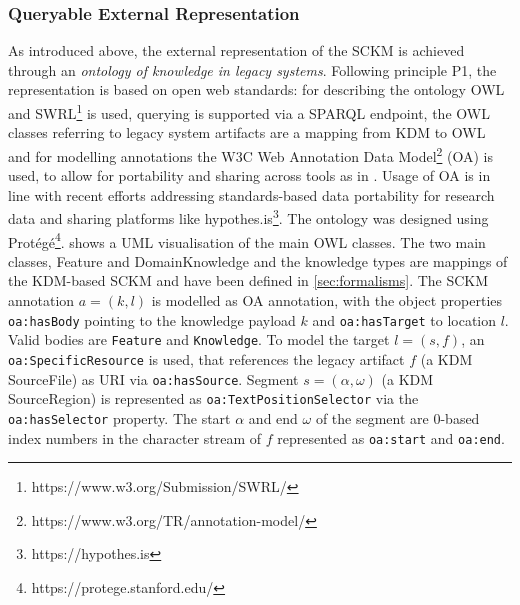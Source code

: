 \hypertarget{sec:re.impl.representation}{%
\subsubsection{Queryable External Representation}\label{sec:re.impl.representation}}

As introduced above, the external representation of the SCKM is achieved through an \emph{ontology of knowledge in legacy systems}.
Following principle P1, the representation is based on open web standards: for describing the ontology OWL and SWRL\footnote{https://www.w3.org/Submission/SWRL/} is used, querying is supported via a SPARQL endpoint, the OWL classes referring to legacy system artifacts are a mapping from KDM to OWL and for modelling annotations the W3C Web Annotation Data Model\footnote{https://www.w3.org/TR/annotation-model/} (OA) is used, to allow for portability and sharing across tools as in \autocite{Diaz2019OpenAnnotationInSLRs}.
Usage of OA is in line with recent efforts addressing standards-based data portability for research data \autocite{Diaz2019OpenAnnotationInSLRs} and sharing platforms like hypothes.is\footnote{https://hypothes.is}.
The ontology was designed using Protégé\footnote{https://protege.stanford.edu/}.
 shows a UML visualisation of the main OWL classes.
The two main classes, Feature and DomainKnowledge and the knowledge types are mappings of the KDM-based SCKM and have been defined in \cref{sec:formalisms}.
The SCKM annotation \(a=(k, l)\) is modelled as OA annotation, with the object properties \texttt{oa:hasBody} pointing to the knowledge payload \(k\) and \texttt{oa:hasTarget} to location \(l\).
Valid bodies are \texttt{Feature} and \texttt{Knowledge}.
To model the target \(l = (s,f)\), an \texttt{oa:SpecificResource} is used, that references the legacy artifact \(f\) (a KDM SourceFile) as URI via \texttt{oa:hasSource}.
Segment \(s=(\alpha, \omega)\) (a KDM SourceRegion) is represented as \texttt{oa:TextPositionSelector} via the \texttt{oa:hasSelector} property.
The start \(\alpha\) and end \(\omega\) of the segment are 0-based index numbers in the character stream of \(f\) represented as \texttt{oa:start} and \texttt{oa:end}.

